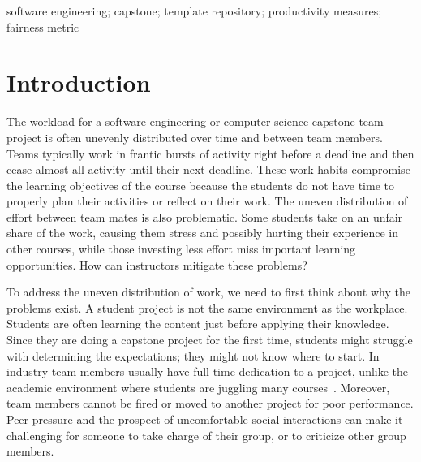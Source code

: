\documentclass[10pt, conference]{IEEEtran}
\begin{document}
\begin{IEEEkeywords}
software engineering; capstone; template repository; productivity measures;
fairness metric
\end{IEEEkeywords}

\section{Introduction} \label{SecIntro}

The workload for a software engineering or computer science capstone team
project is often unevenly distributed over time and between team members.  Teams
typically work in frantic bursts of activity right before a deadline and then
cease almost all activity until their next deadline.  These work habits
compromise the learning objectives of the course because the students do not
have time to properly plan their activities or reflect on their work.  The
uneven distribution of effort between team mates is also problematic.  Some
students take on an unfair share of the work, causing them stress and possibly
hurting their experience in other courses, while those investing less effort
miss important learning opportunities.  How can instructors mitigate these
problems?

To address the uneven distribution of work, we need to first think about why the
problems exist.  A student project is not the same environment as the workplace.
Students are often learning the content just before applying their knowledge.
Since they are doing a capstone project for the first time, students might
struggle with determining the expectations; they might not know where to start.
In industry team members usually have full-time dedication to a project, unlike
the academic environment where students are juggling many
courses~\cite{connReusableAcademicstrengthMetricsbased2004}. Moreover, team
members cannot be fired or moved to another project for poor performance.  Peer
pressure and the prospect of uncomfortable social interactions can make it
challenging for someone to take charge of their group, or to criticize other
group members. %

\end{document}
